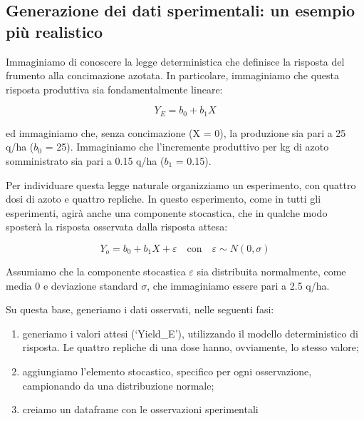 \documentclass[a4paper,12pt,oneside]{book}
\providecommand{\tightlist}{%
  \setlength{\itemsep}{0pt}\setlength{\parskip}{0pt}}
\begin{document}
\hypertarget{generazione-dei-dati-sperimentali-un-esempio-piu-realistico}{%
\subsection{Generazione dei dati sperimentali: un esempio più realistico}\label{generazione-dei-dati-sperimentali-un-esempio-piu-realistico}}

Immaginiamo di conoscere la legge deterministica che definisce la risposta del frumento alla concimazione azotata. In particolare, immaginiamo che questa risposta produttiva sia fondamentalmente lineare:

\[Y_E = b_0 + b_1 X\]

ed immaginiamo che, senza concimazione (X = 0), la produzione sia pari a 25 q/ha (\(b_0\) = 25). Immaginiamo che l'incremente produttivo per kg di azoto somministrato sia pari a 0.15 q/ha (\(b_1\) = 0.15).

Per individuare questa legge naturale organizziamo un esperimento, con quattro dosi di azoto e quattro repliche. In questo esperimento, come in tutti gli esperimenti, agirà anche una componente stocastica, che in qualche modo sposterà la risposta osservata dalla risposta attesa:

\[Y_o = b_0 + b_1 X + \varepsilon \quad \textrm{con}  \quad \varepsilon \sim N(0, \sigma)\]

Assumiamo che la componente stocastica \(\varepsilon\) sia distribuita normalmente, come media 0 e deviazione standard \(\sigma\), che immaginiamo essere pari a 2.5 q/ha.

Su questa base, generiamo i dati osservati, nelle seguenti fasi:

\begin{enumerate}
\def\labelenumi{\arabic{enumi}.}
\tightlist
\item
  generiamo i valori attesi (`Yield\_E'), utilizzando il modello deterministico di risposta. Le quattro repliche di una dose hanno, ovviamente, lo stesso valore;
\item
  aggiungiamo l'elemento stocastico, specifico per ogni osservazione, campionando da una distribuzione normale;
\item
  creiamo un dataframe con le osservazioni sperimentali
\end{enumerate}
\end{document}
